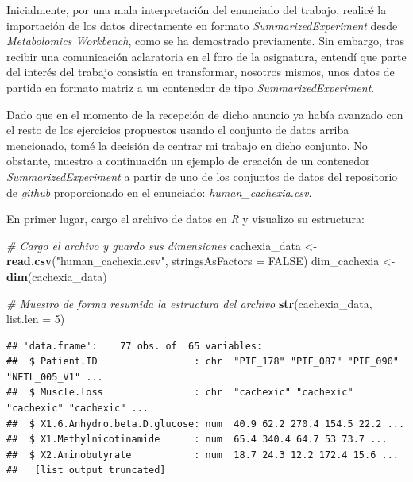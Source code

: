 \documentclass[
]{article}
\newenvironment{Shaded}{\begin{snugshade}}{\end{snugshade}}
\newcommand{\AttributeTok}[1]{\textcolor[rgb]{0.13,0.29,0.53}{#1}}
\newcommand{\CommentTok}[1]{\textcolor[rgb]{0.56,0.35,0.01}{\textit{#1}}}
\newcommand{\ConstantTok}[1]{\textcolor[rgb]{0.56,0.35,0.01}{#1}}
\newcommand{\DecValTok}[1]{\textcolor[rgb]{0.00,0.00,0.81}{#1}}
\newcommand{\FunctionTok}[1]{\textcolor[rgb]{0.13,0.29,0.53}{\textbf{#1}}}
\newcommand{\NormalTok}[1]{#1}
\newcommand{\OtherTok}[1]{\textcolor[rgb]{0.56,0.35,0.01}{#1}}
\newcommand{\StringTok}[1]{\textcolor[rgb]{0.31,0.60,0.02}{#1}}
\begin{document}
Inicialmente, por una mala interpretación del enunciado del trabajo,
realicé la importación de los datos directamente en formato
\emph{SummarizedExperiment} desde \emph{Metabolomics Workbench}, como se
ha demostrado previamente. Sin embargo, tras recibir una comunicación
aclaratoria en el foro de la asignatura, entendí que parte del interés
del trabajo consistía en transformar, nosotros mismos, unos datos de
partida en formato matriz a un contenedor de tipo
\emph{SummarizedExperiment}.

Dado que en el momento de la recepción de dicho anuncio ya había
avanzado con el resto de los ejercicios propuestos usando el conjunto de
datos arriba mencionado, tomé la decisión de centrar mi trabajo en dicho
conjunto. No obstante, muestro a continuación un ejemplo de creación de
un contenedor \emph{SummarizedExperiment} a partir de uno de los
conjuntos de datos del repositorio de \emph{github} proporcionado en el
enunciado: \emph{human\_cachexia.csv}.

En primer lugar, cargo el archivo de datos en \emph{R} y visualizo su
estructura:

\begin{Shaded}
\begin{Highlighting}[]
\CommentTok{\# Cargo el archivo y guardo sus dimensiones}
\NormalTok{cachexia\_data }\OtherTok{\textless{}{-}} \FunctionTok{read.csv}\NormalTok{(}\StringTok{"human\_cachexia.csv"}\NormalTok{, }\AttributeTok{stringsAsFactors =} \ConstantTok{FALSE}\NormalTok{)}
\NormalTok{dim\_cachexia }\OtherTok{\textless{}{-}} \FunctionTok{dim}\NormalTok{(cachexia\_data)}

\CommentTok{\# Muestro de forma resumida la estructura del archivo}
\FunctionTok{str}\NormalTok{(cachexia\_data, }\AttributeTok{list.len =} \DecValTok{5}\NormalTok{)}
\end{Highlighting}
\end{Shaded}

\begin{verbatim}
## 'data.frame':    77 obs. of  65 variables:
##  $ Patient.ID                 : chr  "PIF_178" "PIF_087" "PIF_090" "NETL_005_V1" ...
##  $ Muscle.loss                : chr  "cachexic" "cachexic" "cachexic" "cachexic" ...
##  $ X1.6.Anhydro.beta.D.glucose: num  40.9 62.2 270.4 154.5 22.2 ...
##  $ X1.Methylnicotinamide      : num  65.4 340.4 64.7 53 73.7 ...
##  $ X2.Aminobutyrate           : num  18.7 24.3 12.2 172.4 15.6 ...
##   [list output truncated]
\end{verbatim}
\end{document}
